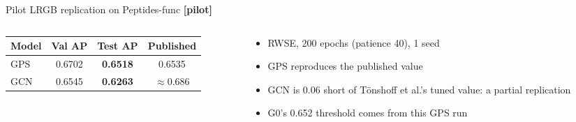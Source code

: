 \documentclass[aspectratio=169,10pt]{beamer}
\newcommand{\pilot}{\textcolor{warm}{\textbf{[pilot]}}}
\begin{document}
\begin{frame}{Pilot LRGB replication on Peptides-func \pilot}
  \begin{columns}[c]
    \begin{column}{0.5\textwidth}
      \centering
      \begin{tabular}{@{}lccc@{}}
        \toprule
        Model & Val AP & Test AP & Published \\
        \midrule
        GPS & 0.6702 & \textbf{0.6518} & 0.6535 \\
        GCN & 0.6545 & \textbf{0.6263} & $\approx$0.686 \\
        \bottomrule
      \end{tabular}
    \end{column}
    \begin{column}{0.46\textwidth}
      \begin{itemize}
        \item RWSE, 200 epochs (patience 40), 1 seed
        \item \textcolor{good}{GPS reproduces} the published value
        \item GCN is 0.06 short of Tönshoff et al.'s tuned value: a \alert{partial} replication
        \item G0's 0.652 threshold comes from this GPS run
      \end{itemize}
    \end{column}
  \end{columns}
\end{frame}
\end{document}
